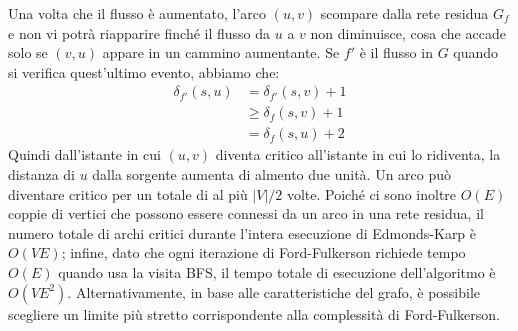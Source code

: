 \noindent Una volta che il flusso è aumentato, l'arco $(u,v)$ scompare dalla rete residua $G_f$ e non vi potrà riapparire finché il flusso da $u$ a $v$
non diminuisce, cosa che accade solo se $(v,u)$ appare in un cammino aumentante. Se $f'$ è il flusso in $G$ quando si verifica quest'ultimo evento,
abbiamo che: \begin{equation}
	\begin{split}
		\delta_{f'}(s,u) &= \delta_{f'}(s,v)+1\\
			&\geq \delta_f(s,v)+1\\
			&= \delta_f(s,u)+2
	\end{split}
\end{equation}
\noindent Quindi dall'istante in cui $(u,v)$ diventa critico all'istante in cui lo ridiventa, la distanza di $u$ dalla sorgente aumenta di almento due
unità. Un arco può diventare critico per un totale di al più $|V|/2$ volte. Poiché ci sono inoltre $O(E)$ coppie di vertici che possono essere connessi
da un arco in una rete residua, il numero totale di archi critici durante l'intera esecuzione di Edmonds-Karp è $O(VE)$; infine, dato che ogni
iterazione di Ford-Fulkerson richiede tempo $O(E)$ quando usa la visita BFS, il tempo totale di esecuzione dell'algoritmo è $O(VE^2)$. Alternativamente,
in base alle caratteristiche del grafo, è possibile scegliere un limite più stretto corrispondente alla complessità di Ford-Fulkerson.

